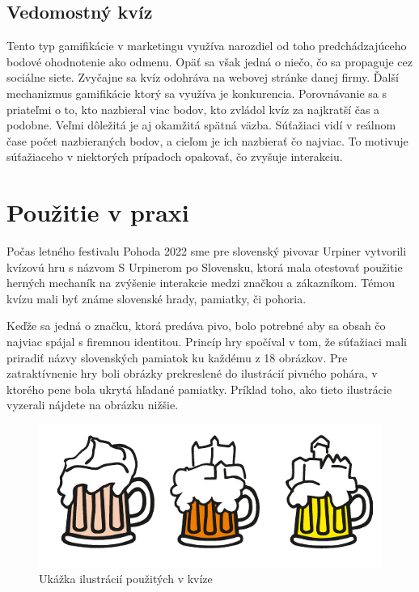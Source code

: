 \documentclass[10pt,twoside,slovak,a4paper]{article}
\begin{document}
\subsection{Vedomostný kvíz}
Tento typ gamifikácie v marketingu využíva narozdiel od toho predchádzajúceho bodové ohodnotenie ako odmenu. Opäť sa však jedná o niečo, čo sa propaguje cez sociálne siete. Zvyčajne sa kvíz odohráva na webovej stránke danej firmy. Ďalší mechanizmus gamifikácie ktorý sa využíva je konkurencia. Porovnávanie sa s priateľmi o to, kto nazbieral viac bodov, kto zvládol kvíz za najkratší čas a podobne. Veľmi dôležitá je aj okamžitá spätná väzba. Súťažiaci vidí v reálnom čase počet nazbieraných bodov, a cieľom je ich nazbierať čo najviac. To motivuje súťažiaceho v niektorých prípadoch opakovať, čo zvyšuje interakciu.


\section{Použitie v praxi}
Počas letného festivalu Pohoda 2022 sme pre slovenský pivovar Urpiner vytvorili kvízovú hru s názvom S Urpinerom po Slovensku, ktorá mala otestovať použitie herných mechaník na zvýšenie interakcie medzi značkou a zákazníkom. Témou kvízu mali byť známe slovenské hrady, pamiatky, či pohoria.

Keďže sa jedná o značku, ktorá predáva pivo, bolo potrebné aby sa obsah čo najviac spájal s firemnou identitou. Princíp hry spočíval v tom, že súťažiaci mali priradiť názvy slovenských pamiatok ku každému z 18 obrázkov. Pre zatraktívnenie hry boli obrázky prekreslené do ilustrácií pivného pohára, v ktorého pene bola ukrytá hľadané pamiatky. Príklad toho, ako tieto ilustrácie vyzerali nájdete na obrázku nižšie.

\begin{figure}[tbh]
	\centering
	\includegraphics[scale=1.0]{obrazok1.pdf}

\caption{Ukážka ilustrácií použitých v kvíze}

\end{figure}
\end{document}
